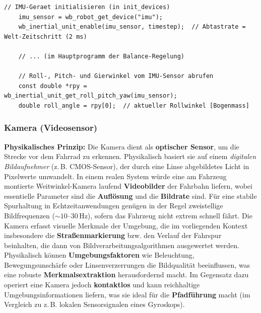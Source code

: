   \newpage
  \begin{lstlisting}[style=wbt_c,caption={IMU-Initialisierung und -Abfrage im C-Controller (Balance-Regelung)},label={lst:imu}]
    // IMU-Geraet initialisieren (in init_devices)
    imu_sensor = wb_robot_get_device("imu");
    wb_inertial_unit_enable(imu_sensor, timestep);  // Abtastrate = Welt-Zeitschritt (2 ms)
  
    // ... (im Hauptprogramm der Balance-Regelung)
  
    // Roll-, Pitch- und Gierwinkel vom IMU-Sensor abrufen
    const double *rpy = wb_inertial_unit_get_roll_pitch_yaw(imu_sensor);
    double roll_angle = rpy[0];  // aktueller Rollwinkel [Bogenmass]

  \end{lstlisting}
  


  \subsubsection{Kamera (Videosensor)}

  \textbf{Physikalisches Prinzip:} Die Kamera dient als \textbf{optischer Sensor}, um die Strecke vor dem Fahrrad zu erkennen. Physikalisch basiert 
  sie auf einem \textit{digitalen Bildaufnehmer} (z.\,B. CMOS-Sensor), der durch eine Linse abgebildetes Licht in Pixelwerte umwandelt. In einem 
  realen System würde eine am Fahrzeug montierte Weitwinkel-Kamera laufend \textbf{Videobilder} der Fahrbahn liefern, wobei essentielle Parameter sind 
  die \textbf{Auflösung} und die \textbf{Bildrate} sind. 
  Für eine stabile Spurhaltung in Echtzeitanwendungen genügen in der Regel zweistellige Bildfrequenzen (\(\sim\!10\text{–}30\,\mathrm{Hz}\)), sofern 
  das Fahrzeug nicht extrem schnell fährt. Die Kamera erfasst visuelle Merkmale der Umgebung, die im vorliegenden Kontext insbesondere die 
  \textbf{Straßenmarkierung} bzw. den Verlauf der Fahrspur beinhalten, die dann von Bildverarbeitungsalgorithmen ausgewertet werden. Physikalisch können \textbf{Umgebungsfaktoren} wie Beleuchtung, 
  Bewegungsunschärfe oder Linsenverzerrungen die Bildqualität beeinflussen, was eine robuste \textbf{Merkmalsextraktion} herausfordernd macht. 
  Im Gegensatz dazu operiert eine Kamera jedoch \textbf{kontaktlos} und kann reichhaltige Umgebungsinformationen liefern, was sie ideal für die 
  \textbf{Pfadführung} macht (im Vergleich zu z.\,B. lokalen Sensorsignalen eines Gyroskops).



